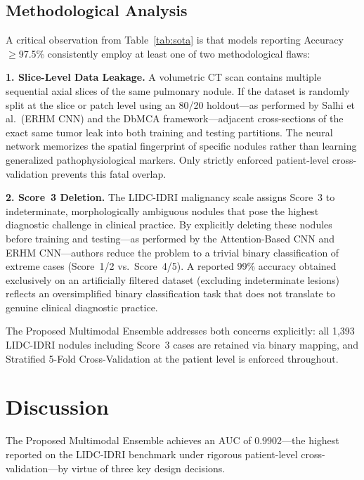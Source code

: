 \documentclass{iopjournal}
\begin{document}
\subsection{Methodological Analysis}

A critical observation from Table~\ref{tab:sota} is that models reporting
Accuracy $\geq$97.5\% consistently employ at least one of two methodological
flaws:

\textbf{1. Slice-Level Data Leakage.} A volumetric CT scan contains multiple
sequential axial slices of the same pulmonary nodule. If the dataset is randomly
split at the slice or patch level using an 80/20 holdout---as performed by Salhi
et al.\ (ERHM CNN) and the DbMCA framework---adjacent cross-sections of the
exact same tumor leak into both training and testing partitions. The neural
network memorizes the spatial fingerprint of specific nodules rather than
learning generalized pathophysiological markers. Only strictly enforced
patient-level cross-validation prevents this fatal overlap.

\textbf{2. Score~3 Deletion.} The LIDC-IDRI malignancy scale assigns Score~3
to indeterminate, morphologically ambiguous nodules that pose the highest
diagnostic challenge in clinical practice. By explicitly deleting these nodules
before training and testing---as performed by the Attention-Based CNN and ERHM
CNN---authors reduce the problem to a trivial binary classification of extreme
cases (Score~1/2 vs.\ Score~4/5). A reported 99\% accuracy obtained
exclusively on an artificially filtered dataset (excluding indeterminate lesions)
reflects an oversimplified binary classification task that does not translate to
genuine clinical diagnostic practice.

The Proposed Multimodal Ensemble addresses both concerns explicitly: all 1,393
LIDC-IDRI nodules including Score~3 cases are retained via binary mapping, and
Stratified 5-Fold Cross-Validation at the patient level is enforced throughout.

\section{Discussion}\label{sec4}

The Proposed Multimodal Ensemble achieves an AUC of 0.9902---the highest
reported on the LIDC-IDRI benchmark under rigorous patient-level
cross-validation---by virtue of three key design decisions.
\end{document}
